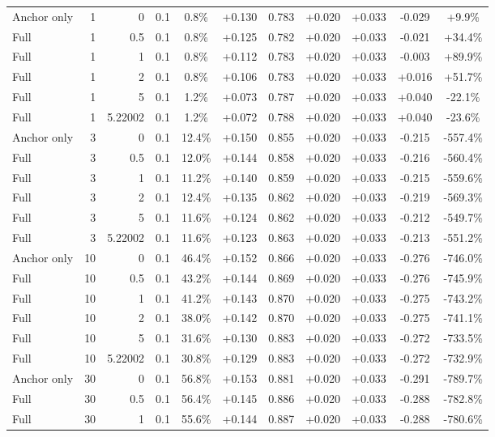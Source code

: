 \begin{table}[htbp]
\begin{tabular}{lrrrccccccc}
Anchor only & 1 & 0 & 0.1 & 0.8\% & +0.130 & 0.783 & +0.020 & +0.033 & -0.029 & +9.9\% \\
Full & 1 & 0.5 & 0.1 & 0.8\% & +0.125 & 0.782 & +0.020 & +0.033 & -0.021 & +34.4\% \\
Full & 1 & 1 & 0.1 & 0.8\% & +0.112 & 0.783 & +0.020 & +0.033 & -0.003 & +89.9\% \\
Full & 1 & 2 & 0.1 & 0.8\% & +0.106 & 0.783 & +0.020 & +0.033 & +0.016 & +51.7\% \\
Full & 1 & 5 & 0.1 & 1.2\% & +0.073 & 0.787 & +0.020 & +0.033 & +0.040 & -22.1\% \\
Full & 1 & 5.22002 & 0.1 & 1.2\% & +0.072 & 0.788 & +0.020 & +0.033 & +0.040 & -23.6\% \\
Anchor only & 3 & 0 & 0.1 & 12.4\% & +0.150 & 0.855 & +0.020 & +0.033 & -0.215 & -557.4\% \\
Full & 3 & 0.5 & 0.1 & 12.0\% & +0.144 & 0.858 & +0.020 & +0.033 & -0.216 & -560.4\% \\
Full & 3 & 1 & 0.1 & 11.2\% & +0.140 & 0.859 & +0.020 & +0.033 & -0.215 & -559.6\% \\
Full & 3 & 2 & 0.1 & 12.4\% & +0.135 & 0.862 & +0.020 & +0.033 & -0.219 & -569.3\% \\
Full & 3 & 5 & 0.1 & 11.6\% & +0.124 & 0.862 & +0.020 & +0.033 & -0.212 & -549.7\% \\
Full & 3 & 5.22002 & 0.1 & 11.6\% & +0.123 & 0.863 & +0.020 & +0.033 & -0.213 & -551.2\% \\
Anchor only & 10 & 0 & 0.1 & 46.4\% & +0.152 & 0.866 & +0.020 & +0.033 & -0.276 & -746.0\% \\
Full & 10 & 0.5 & 0.1 & 43.2\% & +0.144 & 0.869 & +0.020 & +0.033 & -0.276 & -745.9\% \\
Full & 10 & 1 & 0.1 & 41.2\% & +0.143 & 0.870 & +0.020 & +0.033 & -0.275 & -743.2\% \\
Full & 10 & 2 & 0.1 & 38.0\% & +0.142 & 0.870 & +0.020 & +0.033 & -0.275 & -741.1\% \\
Full & 10 & 5 & 0.1 & 31.6\% & +0.130 & 0.883 & +0.020 & +0.033 & -0.272 & -733.5\% \\
Full & 10 & 5.22002 & 0.1 & 30.8\% & +0.129 & 0.883 & +0.020 & +0.033 & -0.272 & -732.9\% \\
Anchor only & 30 & 0 & 0.1 & 56.8\% & +0.153 & 0.881 & +0.020 & +0.033 & -0.291 & -789.7\% \\
Full & 30 & 0.5 & 0.1 & 56.4\% & +0.145 & 0.886 & +0.020 & +0.033 & -0.288 & -782.8\% \\
Full & 30 & 1 & 0.1 & 55.6\% & +0.144 & 0.887 & +0.020 & +0.033 & -0.288 & -780.6\% \\

\end{tabular}
\end{table}
